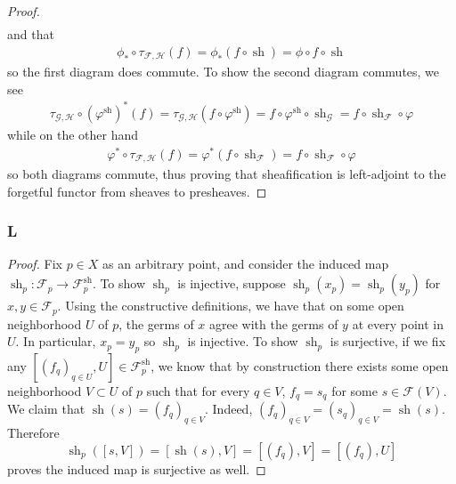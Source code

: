 \documentclass{article}
\newcommand{\fF}{\mathscr{F}}
\newcommand{\fG}{\mathscr{G}}
\newcommand{\fH}{\mathscr{H}}
\DeclareMathOperator{\sh}{sh}
\begin{document}
\begin{proof}
\begin{align*}
    \end{align*}
    and that
    \begin{align*}
        \phi_*\circ \tau_{\fF,\fH}(f)=\phi_*(f\circ \sh)=\phi\circ f\circ \sh
    \end{align*}
    so the first diagram does commute. To show the second diagram commutes, we see
    \begin{align*}
        \tau_{\fG,\fH}\circ (\varphi^{\sh})^*(f)=\tau_{\fG,\fH}(f\circ \varphi^{\sh})=f\circ \varphi^{\sh}\circ \sh_\fG=f\circ \sh_\fF\circ \varphi
    \end{align*}
    while on the other hand
    \begin{align*}
        \varphi^*\circ \tau_{\fF,\fH}(f)=\varphi^*(f\circ \sh_\fF)=f\circ \sh_\fF\circ \varphi
    \end{align*}
    so both diagrams commute, thus proving that sheafification is left-adjoint to the forgetful functor from sheaves to presheaves.
\end{proof}
\subsubsection{L}\label{2.4.L}
\begin{proof}
    Fix $p\in X$ as an arbitrary point, and consider the induced map $\sh_p:\fF_p\to \fF^{\sh}_p$. To show $\sh_p$ is injective, suppose $\sh_p(x_p)=\sh_p(y_p)$ for $x,y\in \fF_p$. Using the constructive definitions, we have that on some open neighborhood $U$ of $p$, the germs of $x$ agree with the germs of $y$ at every point in $U$. In particular, $x_p=y_p$ so $\sh_p$ is injective. To show $\sh_p$ is surjective, if we fix any $[(f_q)_{q\in U},U]\in \fF_p^{\sh}$, we know that by construction there exists some open neighborhood $V\subset U$ of $p$ such that for every $q\in V$, $f_q=s_q$ for some $s\in \fF(V)$. We claim that $\sh(s)=(f_q)_{q\in V}$. Indeed, $(f_q)_{q\in V}=(s_q)_{q\in V}=\sh(s)$. Therefore
    \[
    \sh_p([s,V])=[\sh(s),V]=[(f_q),V]=[(f_q),U]
    \]
    proves the induced map is surjective as well.
\end{proof}
\end{document}
